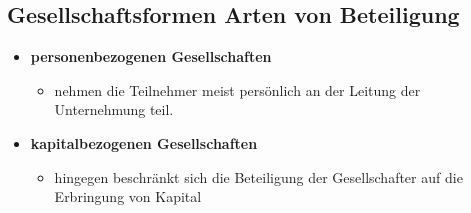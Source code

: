 \documentclass[a4paper]{article}
\begin{document}
    \subsection{Gesellschaftsformen Arten von Beteiligung}
        \begin{itemize}
            \item \textbf{personenbezogenen Gesellschaften}
            \begin{itemize}
                \item nehmen die Teilnehmer meist persönlich an der Leitung der Unternehmung teil.
            \end{itemize} 
            \item \textbf{kapitalbezogenen Gesellschaften}
            \begin{itemize}
                \item hingegen beschränkt sich die
                Beteiligung der Gesellschafter auf die Erbringung von Kapital
            \end{itemize} 
        \end{itemize}
\end{document}
